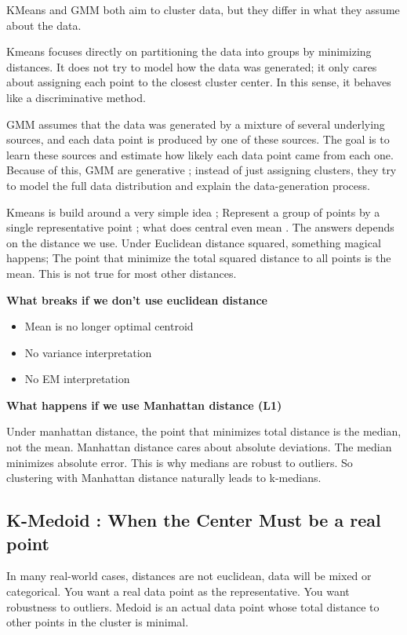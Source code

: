 \documentclass[10pt,a4paper]{article}
\begin{document}
	KMeans and GMM both aim to cluster data, but they differ in what they assume about the data.

	Kmeans focuses directly on partitioning the data into groups by minimizing distances. It does not try to model how the data was generated; it only cares about assigning each point to the closest cluster center. In this sense, it behaves like a discriminative method.

	GMM assumes that the data was generated by a mixture of several underlying sources, and each data point is produced by one of these sources. The goal is to learn these sources and estimate how likely each data point came from each one.
	Because of this, GMM are generative ; instead of just assigning clusters, they try to model the full data distribution and explain the data-generation process.


	Kmeans is build around a very simple idea ; Represent a group of points by a single representative point ; what does central even mean . The answers depends on the distance we use. Under Euclidean distance squared, something magical happens; The point that minimize the total squared distance to all points is the mean. This is not true for most other distances.

	\textbf{What breaks if we don't use euclidean distance}

	\begin{itemize}
		\item Mean is no longer optimal centroid
		\item No variance interpretation
		\item No EM interpretation
	\end{itemize}

	\textbf{What happens if we use Manhattan distance (L1)}

	Under manhattan distance, the point that minimizes total distance is the median, not the mean. Manhattan distance cares about absolute deviations. The median minimizes absolute error. This is why medians are robust to outliers. So clustering with Manhattan distance naturally leads to k-medians.

	\subsection{K-Medoid : When the Center Must be a real point}

	In many real-world cases, distances are not euclidean, data will be mixed or categorical. You want a real data point as the representative. You want robustness to outliers.
	Medoid is an actual data point whose total distance to other points in the cluster is minimal.
\end{document}
